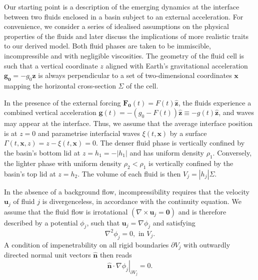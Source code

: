 \documentclass[a4paper]{jpconf}
\newcommand{\unvec}[1]{\bm{\hat{#1}}}
\begin{document}
Our starting point is a description of the emerging dynamics at the interface between two fluids enclosed in a basin subject to an external acceleration. For convenience, we consider a series of idealised assumptions on the physical properties of the fluids and later discuss the implications of more realistic traits to our derived model. Both fluid phases are taken to be immiscible, incompressible and with negligible viscosities. The geometry of the fluid cell is such that a vertical coordinate $z$ aligned with Earth's gravitational acceleration $\bm{g_0}=-g_0\unvec{z}$ is always perpendicular to a set of two-dimensional coordinates $\bm{x}$ mapping the horizontal cross-section $\Sigma$ of the cell. 

In the presence of the external forcing $\bm{F_0}(t)=F(t)\unvec{z}$, the fluids experience a combined vertical acceleration $\bm{g}(t)=-(g_0-F(t))\unvec{z}\equiv-g(t)\unvec{z}$, and waves may appear at the interface. Thus, we assume that the average interface position is at $z=0$ and parametrise interfacial waves $\xi(t,\bm{x})$ by a surface $\Gamma(t,\bm{x},z) = z - \xi(t,\bm{x})=0$. The denser fluid phase is vertically confined by the basin's bottom lid at $z=h_1=-|h_1|$ and has uniform density $\rho_1$. Conversely, the lighter phase with uniform density $\rho_2<\rho_1$ is vertically confined by the basin's top lid at $z=h_2$. The volume of each fluid is then $V_j=|h_j|\Sigma$.

In the absence of a background flow, incompressibility requires that the velocity $\bm{u}_j$ of fluid $j$ is divergenceless, in accordance with the continuity equation. We assume that the fluid flow is irrotational $(\nabla\times\bm{u}_j=\bm{0})$ and is therefore described by a potential $\phi_j$, such that $\bm{u}_j=\nabla\phi_j$ and satisfying
\begin{equation}
    \label{eq:Laplace}
    \nabla^2\phi_j=0,\text{ in }V_j.
\end{equation}
A condition of impenetrability on all rigid boundaries $\partial V_j$ with outwardly directed normal unit vectors $\unvec{n}$ then reads
\begin{equation}
    \label{eq:nopen}
    \left.\unvec{n}\cdot \nabla\phi_j\right|_{\partial V_j}=0.
\end{equation}
\end{document}
